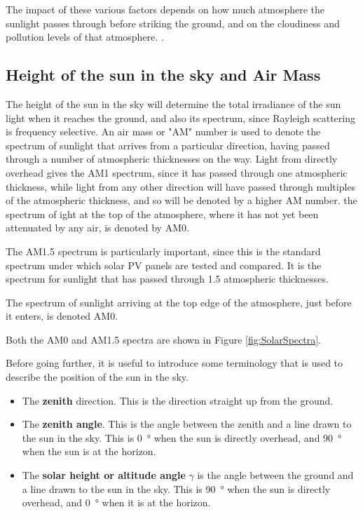 \documentclass[class=scrartcl, crop=false,parskip=half,]{standalone}
\begin{document}
The impact of these various factors depends on how much atmosphere the sunlight passes through before striking the ground, and on the cloudiness and pollution levels of that atmosphere.    \cite{SolarPositionCalculator}.

\subsection{Height of the sun in the sky and Air Mass}
The height of the sun in the sky will determine the total irradiance of the sun light when it reaches the ground, and also its spectrum, since Rayleigh scattering is frequency selective. An air mass or "AM" number is used to denote the spectrum of sunlight that arrives from a particular direction, having passed through a number of atmospheric thicknesses on the way. Light from directly overhead gives the AM1 spectrum, since it has passed through one atmospheric thickness, while light from any other direction will have passed through multiples of the atmospheric thickness, and so will be denoted by a higher AM number. the spectrum of ight at the top of the atmosphere, where it has not yet been attenuated by any air, is denoted by AM0.

The AM1.5 spectrum is particularly important, since this is the standard spectrum under which solar PV panels are tested and compared. It is the spectrum for sunlight that has passed through 1.5 atmospheric thicknesses.

The spectrum of sunlight arriving at the top edge of the atmosphere, just before it enters, is denoted AM0.

Both the AM0 and AM1.5 spectra are shown in Figure \ref{fig:SolarSpectra}.

Before going further, it is useful to introduce some terminology that is  used to describe the position of the sun in the sky.
\begin{itemize}
\item The \textbf{zenith} direction. This is the direction straight up from the ground.
\item The \textbf{zenith angle}. This is the angle between the zenith and a line drawn to the sun in the sky. This is \SI{0}{\degree} when the sun is directly overhead, and \SI{90}{\degree} when the sun is at the horizon.
\item The \textbf{solar height or altitude angle} $\gamma$ is the angle between the ground and a line drawn to the sun in the sky. This is \SI{90}{\degree} when the sun is directly overhead, and \SI{0}{\degree} when it is at the horizon.
\end{itemize}
\end{document}
